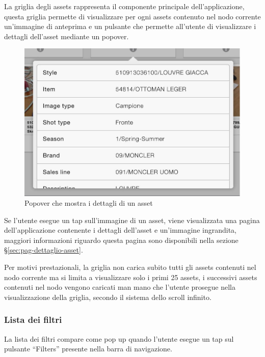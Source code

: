 La griglia degli assets rappresenta il componente principale dell'applicazione, questa griglia permette di visualizzare per ogni assets contenuto nel nodo corrente un'immagine di anteprima e un pulsante che permette all'utente di visualizzare i dettagli dell'asset mediante un popover.

\begin{figure}[htp]
\centering
\includegraphics[width=\textwidth*3/4]{../immagini/warda-gallery-dettaglio}
\caption{Popover che mostra i dettagli di un asset}  
\end{figure}

Se l'utente esegue un tap sull'immagine di un asset, viene visualizzata una pagina dell'applicazione contenente i dettagli dell'asset e un'immagine ingrandita, maggiori informazioni riguardo questa pagina sono disponibili nella sezione §\ref{sec:pag-dettaglio-asset}.


Per motivi prestazionali, la griglia non carica subito tutti gli assets contenuti nel nodo corrente ma si limita a visualizzare solo i primi 25 assets, i successivi assets contenuti nel nodo vengono caricati man mano che l'utente prosegue nella visualizzazione della griglia, secondo il sistema dello scroll infinito.

\subsubsection{Lista dei filtri}

La lista dei filtri compare come pop up quando l'utente esegue un tap sul pulsante ``Filters'' presente nella barra di navigazione.

